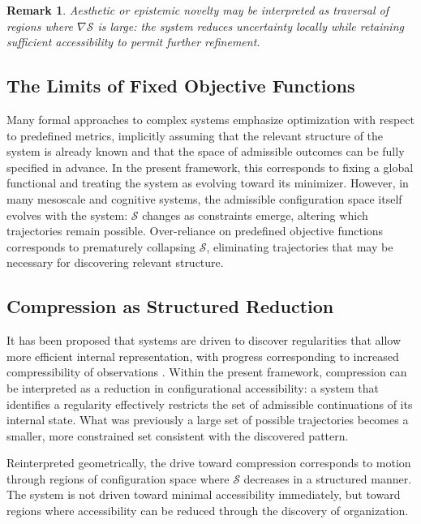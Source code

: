 \documentclass[11pt, a4paper, twocolumn]{article}
\newtheorem{remark}[definition]{Remark}
\newcommand{\Sfield}{\mathcal{S}}
\begin{document}
\begin{remark}
Aesthetic or epistemic novelty may be interpreted as traversal of regions where
$\nabla\Sfield$ is large: the system reduces uncertainty locally while
retaining sufficient accessibility to permit further refinement.
\end{remark}

\subsection{The Limits of Fixed Objective Functions}

Many formal approaches to complex systems emphasize optimization with respect
to predefined metrics, implicitly assuming that the relevant structure of the
system is already known and that the space of admissible outcomes can be fully
specified in advance. In the present framework, this corresponds to fixing a
global functional and treating the system as evolving toward its minimizer.
However, in many mesoscale and cognitive systems, the admissible configuration
space itself evolves with the system: $\Sfield$ changes as constraints emerge,
altering which trajectories remain possible. Over-reliance on predefined
objective functions corresponds to prematurely collapsing $\Sfield$, eliminating
trajectories that may be necessary for discovering relevant structure.

\subsection{Compression as Structured Reduction}

It has been proposed that systems are driven to discover regularities that allow
more efficient internal representation, with progress corresponding to increased
compressibility of observations \cite{schmidhuber1991,schmidhuber2006}. Within
the present framework, compression can be interpreted as a reduction in
configurational accessibility: a system that identifies a regularity effectively
restricts the set of admissible continuations of its internal state. What was
previously a large set of possible trajectories becomes a smaller, more
constrained set consistent with the discovered pattern.

Reinterpreted geometrically, the drive toward compression corresponds to motion
through regions of configuration space where $\Sfield$ decreases in a structured
manner. The system is not driven toward minimal accessibility immediately, but
toward regions where accessibility can be reduced through the discovery of
organization.
\end{document}
